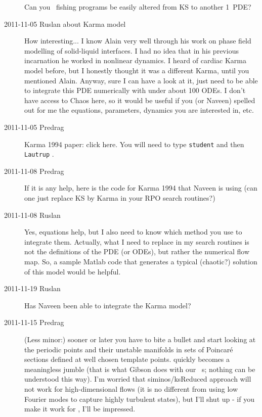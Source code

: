 \begin{description}
Can you \rpo\ fishing programs be easily altered from KS to another
1\dmn\ PDE?

\item[2011-11-05 Ruslan about Karma model]  How interesting... I know
Alain very well through his work on phase field modelling of solid-liquid
interfaces.  I had no idea that in his previous incarnation he worked in
nonlinear dynamics.  I heard of cardiac Karma model before, but I
honestly thought it was a different Karma, until you mentioned Alain.
Anyway, sure I can have a look at it, just need to be able to integrate
this PDE numerically with under about 100 ODEs.  I don't have access to
Chaos here, so it would be useful if you (or Naveen) spelled out for me
the equations, parameters, dynamics you are interested in, etc.

\item[2011-11-05 Predrag] Karma 1994 paper:
{click here}. You will need to type \texttt{student} and then \texttt{Lautrup} .

\item[2011-11-08 Predrag] If it is any help, here is the code for Karma 1994 that Naveen is using
(can one just replace KS by Karma in your RPO search routines?)

\item[2011-11-08 Ruslan] Yes, equations help, but I also need to know which method you use to integrate them.
Actually, what I need to replace in my search routines is not the definitions of the PDE (or ODEs), but rather the numerical flow map.
So, a sample Matlab code that generates a typical (chaotic?) solution of this model would be helpful.

\item[2011-11-19 Ruslan] Has Naveen been able to integrate the Karma model?

\item[2011-11-15 Predrag] (Less minor:) sooner or later you have to bite
a bullet and start looking at the periodic points and their unstable
manifolds in sets of Poincar\'e sections defined at well chosen template
points.  quickly becomes a meaningless jumble (that
is what Gibson does with our \pCf\ \po s; nothing can be
understood this way). I'm worried that siminos/ksReduced
approach will not work for high-dimensional flows (it is no different
from using low Fourier modes to capture highly turbulent states), but
I'll shut up - if you make it work for \KS, I'll be impressed.


\end{description}
